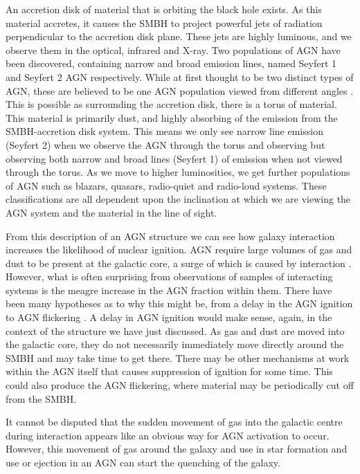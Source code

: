 An accretion disk of material that is orbiting the black hole exists. As this material accretes, it causes the SMBH to project powerful jets of radiation perpendicular to the accretion disk plane. These jets are highly luminous, and we observe them in the optical, infrared and X-ray. Two populations of AGN have been discovered, containing narrow and broad emission lines, named Seyfert 1 and Seyfert 2 AGN respectively. While at first thought to be two distinct types of AGN, these are believed to be one AGN population viewed from different angles \citep[for a review of the unification, see][]{2015ARA&A..53..365N}. This is possible as surrounding the accretion disk, there is a torus of material. This material is primarily dust, and highly absorbing of the emission from the SMBH-accretion disk system. This means we only see narrow line emission (Seyfert 2) when we observe the AGN through the torus and observing but observing both narrow and broad lines (Seyfert 1) of emission when not viewed through the torus. As we move to higher luminosities, we get further populations of AGN such as blazars, quasars, radio-quiet and radio-loud systems. These classifications are all dependent upon the inclination at which we are viewing the AGN system and the material in the line of sight.

From this description of an AGN structure we can see how galaxy interaction increases the likelihood of nuclear ignition. AGN require large volumes of gas and dust to be present at the galactic core, a surge of which is caused by interaction \citep[][provides an excellent summary of this process from the point of view of simulations]{2008ApJS..175..356H}. However, what is often surprising from observations of samples of interacting systems is the meagre increase in the AGN fraction within them. There have been many hypotheses as to why this might be, from a delay in the AGN ignition \citep{2011MNRAS.418.2043E} to AGN flickering \citep{2015MNRAS.451.2517S}. A delay in AGN ignition would make sense, again, in the context of the structure we have just discussed. As gas and dust are moved into the galactic core, they do not necessarily immediately move directly around the SMBH and may take time to get there. There may be other mechanisms at work within the AGN itself that causes suppression of ignition for some time. This could also produce the AGN flickering, where material may be periodically cut off from the SMBH.

It cannot be disputed that the sudden movement of gas into the galactic centre during interaction appears like an obvious way for AGN activation to occur. However, this movement of gas around the galaxy and use in star formation and use or ejection in an AGN can start the quenching of the galaxy. 

